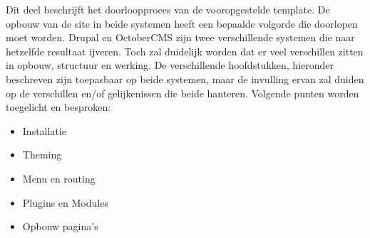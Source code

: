 \label{ch:methodologie}

Dit deel beschrijft het doorloopproces van de vooropgestelde template. De opbouw van de site in beide systemen heeft een bepaalde volgorde die doorlopen moet worden. Drupal en OctoberCMS zijn twee verschillende systemen die naar hetzelfde resultaat ijveren. Toch zal duidelijk worden dat er veel verschillen zitten in opbouw, structuur en werking.
\newline\newline
De verschillende hoofdstukken, hieronder beschreven zijn toepasbaar op beide systemen, maar de invulling ervan zal duiden op de verschillen en/of gelijkenissen die beide hanteren. Volgende punten worden toegelicht en besproken:

\begin{itemize}
\item Installatie
\item Theming
\item Menu en routing
\item Plugins en Modules
\item Opbouw pagina's
\end{itemize}

\pagebreak